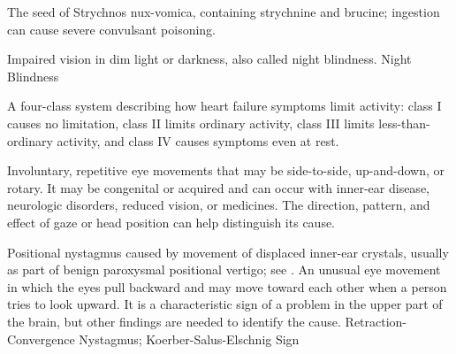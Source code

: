  The seed of Strychnos nux-vomica, containing strychnine and brucine; ingestion can cause severe convulsant poisoning.

 Impaired vision in dim light or darkness, also called night blindness.
\synonyms
Night Blindness

 A four-class system describing how heart failure symptoms limit activity: class I causes no limitation, class II limits ordinary activity, class III limits less-than-ordinary activity, and class IV causes symptoms even at rest.

 Involuntary, repetitive eye movements that may be side-to-side, up-and-down, or rotary. It may be congenital or acquired and can occur with inner-ear disease, neurologic disorders, reduced vision, or medicines. The direction, pattern, and effect of gaze or head position can help distinguish its cause.

 Positional nystagmus caused by movement of displaced inner-ear crystals, usually as part of benign paroxysmal positional vertigo; see .
 An unusual eye movement in which the eyes pull backward and may move toward each other when a person tries to look upward. It is a characteristic sign of a problem in the upper part of the brain, but other findings are needed to identify the cause.
\synonyms
Retraction-Convergence Nystagmus; Koerber-Salus-Elschnig Sign
